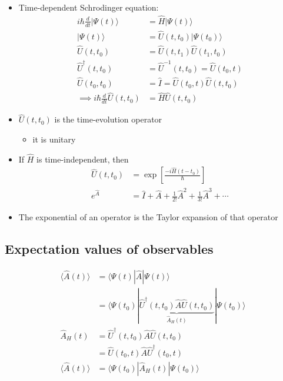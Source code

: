 \documentclass[a4paper,11pt,normalem]{article}
\begin{document}
\begin{itemize}
\item
  Time-dependent Schrodinger equation:
\[
    \begin{aligned}
    i\hbar\frac{d}{dt}|\Psi(t)\rangle &= \hat{H}|\Psi(t)\rangle \\
    |\Psi(t)\rangle &= \hat{U}(t,t_0)|\Psi(t_0)\rangle \\
    \hat{U}(t,t_0) &= \hat{U}(t,t_1)\hat{U}(t_1,t_0) \\
    \hat{U}^\dagger(t,t_0) &= \hat{U}^{-1}(t,t_0) = \hat{U}(t_0,t) \\
    \hat{U}(t_0,t_0) &= \hat{I} = \hat{U}(t_0,t)\hat{U}(t,t_0) \\
    \implies i\hbar\frac{d}{dt}\hat{U}(t,t_0) &= \hat{H}\hat{U}(t,t_0)
    \end{aligned}
\]
\item
  \(\hat{U}(t,t_0)\) is the time-evolution operator
  \begin{itemize}
  \item
    it is unitary
  \end{itemize}
\item
  If \(\hat{H}\) is time-independent, then
\[
    \begin{aligned}
    \hat{U}(t,t_0) &= \exp\left[\frac{-i\hat{H}(t-t_0)}{\hbar}\right] \\
    e^{\hat{A}} &= \hat{I} + \hat{A} + \frac{1}{2!}\hat{A}^2 + \frac{1}{3!}\hat{A}^3 + \cdots
    \end{aligned}
\]
\item
  The exponential of an operator is the Taylor expansion of that
  operator
\end{itemize}

\subsection{Expectation values of observables}\label{expectation-values-of-observables}

\[
    \begin{aligned}
    \langle\hat{A}(t)\rangle &= \langle\Psi(t)|\hat{A}|\Psi(t)\rangle \\
    &= \langle\Psi(t_0)|\underbrace{\hat{U}^\dagger(t,t_0)\hat{A}\hat{U}(t,t_0)}_{\hat{A}_H(t)}|\Psi(t_0)\rangle \\
    \hat{A}_H(t) &= \hat{U}^\dagger(t,t_0)\hat{A}\hat{U}(t,t_0) \\
    &= \hat{U}(t_0,t)\hat{A}\hat{U}^\dagger(t_0,t) \\
    \langle\hat{A}(t)\rangle &= \langle\Psi(t_0)|\hat{A}_H(t)|\Psi(t_0)\rangle
    \end{aligned}
\]
\end{document}
